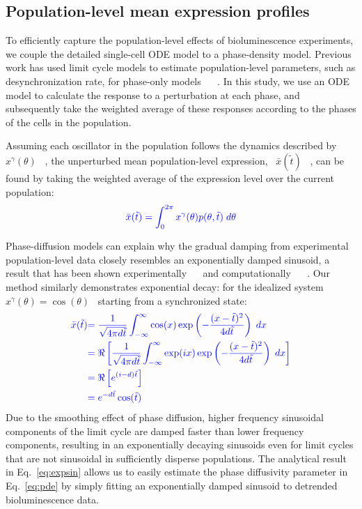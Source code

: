 \documentclass[11pt, letterpaper]{article}
\providecommand{\DIFadd}[1]{{\protect\color{blue}#1}} %
\providecommand{\DIFaddbegin}{} %
\providecommand{\DIFaddend}{} %
\begin{document}
\DIFaddbegin \subsection*{\DIFadd{Population-level mean expression profiles}}

\DIFadd{To efficiently capture }\DIFaddend the population-level \DIFaddbegin \DIFadd{effects of bioluminescence experiments, we couple the detailed }\DIFaddend single-cell \DIFaddbegin \DIFadd{ODE model to a phase-density model.
Previous work has used limit cycle models to estimate population-level parameters, such as desynchronization rate, for phase-only models \mbox{%
\cite{Rougemont2007}
}%
.
In this study, we use an ODE model to calculate the response to a perturbation at each phase, and subsequently take the weighted average of these responses according to the phases of the cells in the population}\DIFaddend .

\DIFaddbegin \DIFadd{Assuming each oscillator in the population follows the dynamics described by \mbox{%
$x^\gamma(\theta)$
}%
, the unperturbed mean }\DIFaddend population-level \DIFaddbegin \DIFadd{expression, \mbox{%
$\bar{x}(\tilde{t})$
}%
, can be found by taking the weighted average of the expression level over the current population:
}\begin{equation}\DIFadd{
  \bar{x}(\tilde{t}) = \int_0^{2\pi} x^\gamma(\theta) p(\theta, \tilde{t}) \;
  d\theta
  \label{eq:xbar}
}\end{equation}

\DIFadd{Phase-diffusion models can explain why the gradual damping from experimental }\DIFaddend population-level \DIFaddbegin \DIFadd{data closely resembles an exponentially damped sinusoid, a result that has been shown experimentally \mbox{%
\cite{Welsh2004}
}%
and computationally \mbox{%
\cite{Rougemont2007}
}%
.
Our method similarly demonstrates exponential decay: for the idealized system \mbox{%
$x^\gamma(\theta) = \cos(\theta)$
}%
starting from a synchronized state:
}\begin{align}\DIFadd{
  \bar{x}(\tilde{t}) }&\DIFadd{= \frac{1}{\sqrt{4\pi d\tilde{t}}}\int_{-\infty}^{\infty}
  \cos(x) \exp\left(-\frac{(x - \tilde{t})^2}{4d\tilde{t}}\right)\; dx }\\
  &\DIFadd{= \Re\left[\frac{1}{\sqrt{4\pi d\tilde{t}}}\int_{-\infty}^{\infty}
    \exp(ix) \exp\left(-\frac{(x - \tilde{t})^2}{4d\tilde{t}}\right)\; dx\right] }\\
    &\DIFadd{= \Re\left[e^{(i - d)\tilde{t}}\right]}\\
    &\DIFadd{= e^{-d\tilde{t}} \cos(\tilde{t}) \label{eq:expsin}
}\end{align}
\DIFadd{Due to the smoothing effect of phase diffusion, higher frequency sinusoidal components of the limit cycle are damped faster than lower frequency components, resulting in an exponentially decaying sinusoids even for limit cycles that are not sinusoidal in sufficiently disperse populations.
The analytical result in Eq.~\ref{eq:expsin} allows us to easily estimate the phase diffusivity parameter in Eq.~\ref{eq:pde} by simply fitting an exponentially damped sinusoid to detrended bioluminescence data.
}
\end{document}
